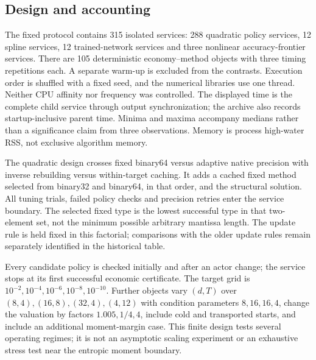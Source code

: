 \documentclass[ecta,nameyear,draft]{econsocart}
\theoremstyle{definition}
\theoremstyle{remark}
\begin{document}
\subsection{Design and accounting}
The fixed protocol contains 315 isolated services: 288 quadratic policy
services, 12 spline services, 12 trained-network services and three nonlinear
accuracy-frontier services. There are 105 deterministic economy--method objects
with three timing repetitions each. A separate warm-up is excluded from the
contrasts. Execution order is shuffled with a fixed seed, and the numerical
libraries use one thread. Neither CPU affinity nor frequency was controlled.
The displayed time is the complete child service through output synchronization;
the archive also records startup-inclusive parent time. Minima and maxima
accompany medians rather than a significance claim from three observations.
Memory is process high-water RSS, not exclusive algorithm memory.

The quadratic design crosses fixed binary64 versus adaptive native precision
with inverse rebuilding versus within-target caching. It adds a cached fixed
method selected from binary32 and binary64, in that order, and the structural
solution. All tuning trials, failed policy checks and precision retries enter
the service boundary. The selected fixed type is the lowest successful type in
that two-element set, not the minimum possible arbitrary mantissa length.
The update rule is held fixed in this factorial; comparisons with the older
update rules remain separately identified in the historical table.

Every candidate policy is checked initially and after an actor change; the
service stops at its first successful economic certificate. The target grid is
$10^{-2},10^{-4},10^{-6},10^{-8},10^{-10}$. Further objects vary $(d,T)$ over
$(8,4),(16,8),(32,4),(4,12)$ with condition parameters $8,16,16,4$, change the
valuation by factors $1.005,1/4,4$, include cold and transported starts, and
include an additional moment-margin case. This finite design tests several
operating regimes; it is not an asymptotic scaling experiment or an exhaustive
stress test near the entropic moment boundary.
\end{document}

